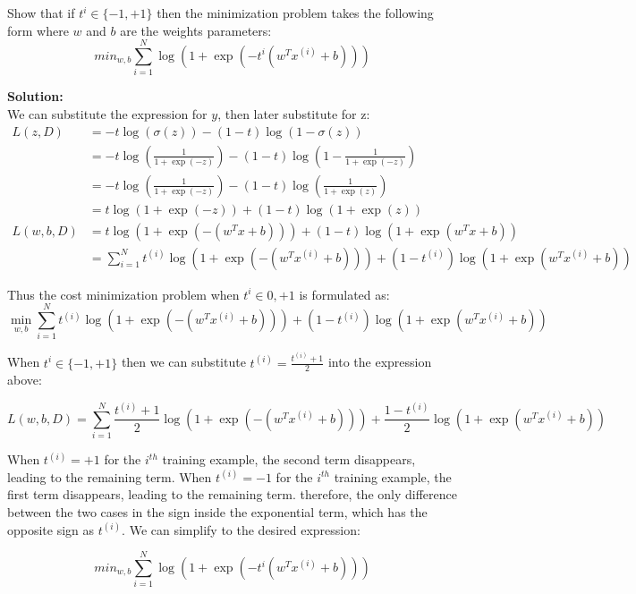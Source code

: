 \documentclass[12pt]{article}
\begin{document}
	Show that if $t^i \in \{-1, +1\}$ then the minimization problem takes the following form where $w$ and $b$ are the weights parameters:
	\begin{equation}
		min_{w,b} \sum_{i=1}^{N} \log (1+\exp({-t^i(w^Tx^{(i)} + b)}))
	\end{equation}
	
	\begin{framed}
		\textbf{Solution:} \\
		We can substitute the expression for $y$, then later substitute for z:
		\begin{align}
			L(z,D) &= -t \log (\sigma(z)) - (1-t) \log (1-\sigma(z)) \\
			&= -t \log \left( \frac{1}{1+\exp (-z)}  \right) - (1-t) \log \left( 1 - \frac{1}{1+\exp (-z)}  \right) \\
			&= -t \log \left( \frac{1}{1+\exp (-z)}  \right) - (1-t) \log \left(\frac{1}{1+\exp (z)}  \right) \\
			&= t \log \left( 1 + \exp (-z) \right) + (1-t) \log \left( 1 + \exp(z) \right) \\
			L(w,b,D) &= t \log \left( 1 + \exp (-(w^Tx + b)) \right) + (1-t) \log \left( 1 + \exp(w^Tx+b) \right) \\
			&= \sum_{i=1}^{N} t^{(i)} \log \left( 1 + \exp (-(w^T x^{(i)} + b)) \right) + (1-t^{(i)}) \log \left( 1 + \exp(w^T x^{(i)}+b) \right) 
		\end{align}
		
		Thus the cost minimization problem when  $t^i \in {0, +1}$ is formulated as:
		\begin{equation}
			\min_{w,b} \sum_{i=1}^{N} t^{(i)} \log \left( 1 + \exp (-(w^T x^{(i)} + b)) \right) + (1-t^{(i)}) \log \left( 1 + \exp(w^T x^{(i)}+b) \right) 
		\end{equation}
		
		When $t^i \in \{-1, +1\}$ then we can substitute $t^{(i)} = \frac{t^{(i)} + 1}{2}$ into the expression above:
		
		\begin{equation}
			L(w,b,D) = \sum_{i=1}^{N} \frac{t^{(i)}+1}{2} \log \left( 1 + \exp (-(w^T x^{(i)} + b)) \right) + \frac{1-t^{(i)}}{2} \log \left( 1 + \exp(w^T x^{(i)}+b) \right) 
		\end{equation}
		
		When $t^{(i)} = +1$ for the $i^{th}$ training example, the second term disappears, leading to the remaining term. When $t^{(i)} = -1$ for the $i^{th}$ training example, the first term disappears, leading to the remaining term. therefore, the only difference between the two cases in the sign inside the exponential term, which has the opposite sign as $t^{(i)}$. We can simplify to the desired expression:
		
		\begin{equation}
			min_{w,b} \sum_{i=1}^{N} \log (1+\exp({-t^i(w^Tx^{(i)} + b)}))
		\end{equation}
		
	\end{framed}
	
\end{document}

